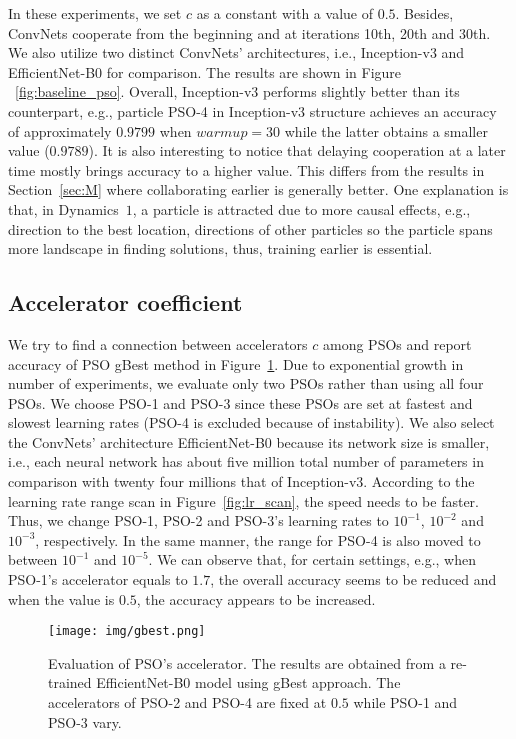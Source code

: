 \documentclass{ieeeaccess}
\begin{document}
In these experiments, we set $c$ as a constant with a value of $0.5$. Besides, ConvNets cooperate from the beginning and at iterations 10th, 20th and 30th. We also utilize two distinct ConvNets' architectures, i.e., Inception-v3 and EfficientNet-B0 for comparison. The results are shown in Figure ~\ref{fig:baseline_pso}. Overall, Inception-v3 performs slightly better than its counterpart, e.g., particle PSO-4 in Inception-v3 structure achieves an accuracy of approximately $0.9799$ when $warmup=30$ while the latter obtains a smaller value ($0.9789$). It is also interesting to notice that delaying cooperation at a later time mostly brings accuracy to a higher value. This differs from the results in Section~\ref{sec:M} where collaborating earlier is generally better. One explanation is that, in Dynamics~$1$, a particle is attracted due to more causal effects, e.g., direction to the best location, directions of other particles so the particle spans more landscape in finding solutions, thus, training earlier is essential.
\subsection{Accelerator coefficient}
We try to find a connection between accelerators $c$ among PSOs and report accuracy of PSO gBest method in Figure~\ref{fig:gbest}. Due to exponential growth in number of experiments, we evaluate only two PSOs rather than using all four PSOs. We choose PSO-1 and PSO-3 since these PSOs are set at fastest and slowest learning rates (PSO-4 is excluded because of instability). We also select the ConvNets' architecture EfficientNet-B0 because its network size is smaller, i.e., each neural network has about five million total number of parameters in comparison with twenty four millions that of Inception-v3. According to the learning rate range scan in Figure~\ref{fig:lr_scan}, the speed needs to be faster. Thus, we change  PSO-1, PSO-2 and PSO-3's learning rates to $10^{-1}$, $10^{-2}$ and $10^{-3}$, respectively. In the same manner, the range for PSO-4 is also moved to between $10^{-1}$ and $10^{-5}$. We can observe that, for certain settings, e.g., when PSO-1's accelerator equals to $1.7$, the overall accuracy seems to be reduced and when the value is $0.5$, the accuracy appears to be increased.
\begin{figure}[hbt!]
\begin{center}
\texttt{[image: img/gbest.png]}
\caption{Evaluation of PSO's accelerator. The results are obtained from a re-trained EfficientNet-B0 model using gBest approach. The accelerators of PSO-2 and PSO-4 are fixed at $0.5$ while PSO-1 and PSO-3 vary.}
\label{fig:gbest}
\end{center}
\end{figure}
\end{document}
